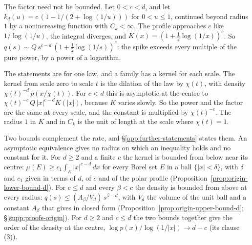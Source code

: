 The factor need not be bounded. Let $0 < c < d$, and let $k_d(u) = c\,(1 - 1/(2 + \log(1/u)))$
for $0 < u \le 1$, continued beyond radius $1$ by a nonincreasing function with $C_k < \infty$.
The profile approaches $c$ like $1/\log(1/u)$, the integral diverges, and
$K(x) = (1 + \tfrac12\log(1/x))^{c}$. So $q(s) \sim Q\,s^{c-d}\,(1 + \tfrac12\log(1/s))^{c}$:
the spike exceeds every multiple of the pure power, by a power of a logarithm.

The statements are for one law, and a family has a kernel for each scale. The kernel from scale
zero to scale $t$ is the dilation of the law by $\chi(t)$, with density
$\chi(t)^{-d}\,p(x/\chi(t))$. For $c < d$ this is asymptotic at the centre to
$\chi(t)^{-c}\,Q\,|x|^{c-d}K(|x|)$, because $K$ varies slowly. So the power and the factor are
the same at every scale, and the constant is multiplied by $\chi(t)^{-c}$. The radius $1$ in $K$
and in $C_k$ is the unit of length at the scale where $\chi(t) = 1$.

Two bounds complement the rate, and \S\ref{app:further-statements} states them. An
asymptotic equivalence gives no radius on which an inequality holds and no constant for it. For
$d \ge 2$ and a finite $c$ the kernel is bounded from below near its centre:
$\mu(E) \ge c_1\int_E |x|^{c-d}\,dx$ for every Borel set $E$ in a ball $\{|x| < \delta\}$, with
$\delta$ and $c_1$ given in terms of $d$, of $c$ and of the polar profile
(Proposition~\ref{prop:origin-lower-bound-d}). For $c \le d$ and every $\beta < c$ the
density is bounded from above at every radius: $q(s) \le (A_\beta/V_d)\,s^{\beta-d}$, with $V_d$
the volume of the unit ball and a constant $A_\beta$ that \suppl{} gives in closed form
(Proposition~\ref{prop:origin-upper-bound-d}; \S\ref{supp:proofs-origin}). For $d \ge 2$ and $c \le d$ the
two bounds together give the
order of the density at the centre, $\log p(x)/\log(1/|x|) \to d - c$ (its clause (3)).

